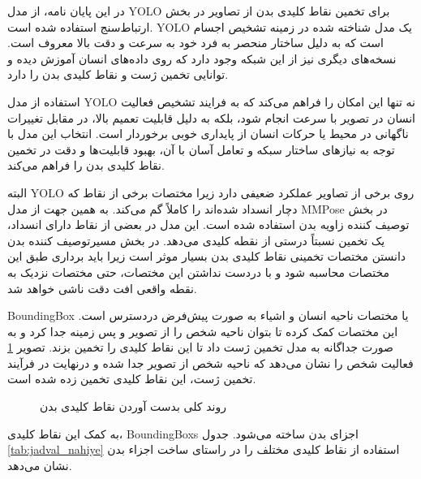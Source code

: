 در این پایان نامه، از مدل YOLO%
 برای تخمین نقاط کلیدی بدن از تصاویر در بخش ارتباط‌سنج استفاده شده است. YOLO یک مدل شناخته ‌شده در زمینه تشخیص اجسام است که به دلیل ساختار منحصر به فرد خود به سرعت و دقت بالا معروف است. نسخه‌های دیگری نیز از این شبکه وجود دارد که روی داده‌های انسان آموزش دیده و توانایی تخمین ژست و نقاط کلیدی بدن را دارد.

استفاده از مدل YOLO نه تنها این امکان را فراهم می‌کند که به فرایند تشخیص فعالیت انسان در تصویر با سرعت انجام شود، بلکه به دلیل قابلیت تعمیم بالا، در مقابل تغییرات ناگهانی در محیط یا حرکات انسان از پایداری خوبی برخوردار است. انتخاب این مدل با توجه به نیازهای ساختار سبکه و تعامل آسان با آن، بهبود قابلیت‌ها و دقت در تخمین نقاط کلیدی بدن را فراهم می‌کند.

البته YOLO روی برخی از تصاویر عملکرد ضعیفی دارد زیرا مختصات برخی از نقاط که دچار انسداد شده‌اند را کاملاً گم می‌کند. به همین جهت از مدل MMPose در بخش توصیف کننده زاویه بدن استفاده شده است. این مدل در بعضی از نقاط دارای انسداد، یک تخمین نسبتاً درستی از نقطه کلیدی می‌دهد. در بخش مسیرتوصیف کننده بدن دانستن مختصات تخمینی نقاط کلیدی بدن بسیار موثر است زیرا باید برداری طبق این‌ مختصات محاسبه شود و با دردست نداشتن این مختصات، حتی مختصات نزدیک به نقطه واقعی افت دقت ناشی خواهد شد.

\gls{BoundingBox}
 یا مختصات ناحیه انسان و اشیاء به صورت پیش‌فرض دردسترس است. این مختصات کمک کرده تا بتوان ناحیه شخص را از تصویر و پس زمینه جدا کرد و به صورت جداگانه به مدل تخمین ژست داد تا این نقاط کلیدی را تخمین بزند. تصویر %
\ref{fig:koli_ensan_nogte}
فعالیت شخص را نشان می‌دهد که ناحیه شخص از تصویر جدا شده و درنهایت در فرآیند تخمین ژست،‌ این نقاط کلیدی تخمین زده شده است. 
  \begin{figure}
 	\centering
 	\hfill
 	\hfill
 	\caption{روند کلی بدست آوردن نقاط کلیدی بدن}
 	\label{fig:koli_ensan_nogte}
 \end{figure}
 به کمک این نقاط کلیدی، %
 \glspl{BoundingBox}
  اجزای بدن ساخته می‌شود. جدول %
 \ref{tab:jadval_nahiye}
 استفاده از نقاط کلیدی مختلف را در راستای ساخت اجزاء بدن نشان می‌دهد.\\
 
